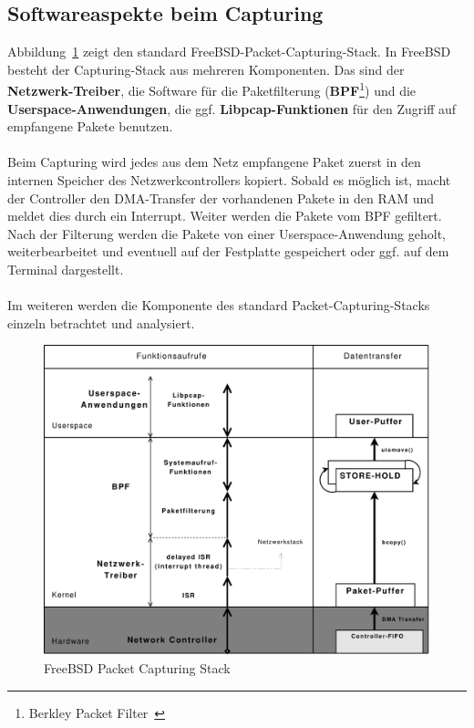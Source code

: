 \subsection{Softwareaspekte beim Capturing}\label{subsec:sw_cap}
Abbildung~\ref{bsd_cap_stack} zeigt den standard
FreeBSD-Packet-Capturing-Stack.  In FreeBSD besteht der Capturing-Stack aus
mehreren Komponenten.  Das sind der \textbf{Netzwerk-Treiber}, die Software für
die Paketfilterung (\textbf{BPF}\footnote{Berkley Packet Filter~\cite{bpf_wiki,
man_bpf, man_kernel_bpf}}) und die \textbf{Userspace-Anwendungen}, die ggf.
\textbf{Libpcap-Funktionen} für den Zugriff auf empfangene Pakete benutzen.\\\\
%
Beim Capturing wird jedes aus dem Netz empfangene Paket zuerst in den internen
Speicher des Netzwerkcontrollers kopiert. Sobald es möglich ist, macht der
Controller den DMA-Transfer der vorhandenen Pakete in den RAM und meldet dies
durch ein Interrupt. Weiter werden die Pakete vom BPF gefiltert. Nach der
Filterung werden die Pakete von einer Userspace-Anwendung geholt,
weiterbearbeitet und eventuell auf der Festplatte gespeichert oder ggf.  auf
dem Terminal dargestellt.\\\\
%
Im weiteren werden die Komponente des standard Packet-Capturing-Stacks einzeln 
betrachtet und analysiert.


\begin{figure}
\centering \includegraphics[width=5.1in]{bilder/3copy}
\caption{FreeBSD Packet Capturing Stack}
\label{bsd_cap_stack}
\end{figure}
%
